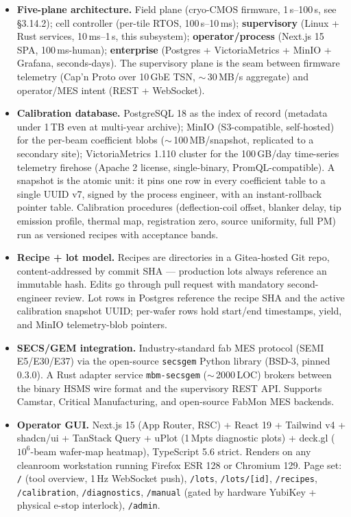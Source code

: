 \documentclass[11pt,letterpaper]{article}
\begin{document}
\begin{itemize}[leftmargin=1.6em]
  \item \textbf{Five-plane architecture.} Field plane (cryo-CMOS firmware, 1\,\textmu s--100\,\textmu s, see \S 3.14.2); cell controller (per-tile RTOS, 100\,\textmu s--10\,ms); \textbf{supervisory} (Linux + Rust services, 10\,ms--1\,s, this subsystem); \textbf{operator/process} (Next.js 15 SPA, 100\,ms-human); \textbf{enterprise} (Postgres + VictoriaMetrics + MinIO + Grafana, seconds-days). The supervisory plane is the seam between firmware telemetry (Cap'n Proto over 10\,GbE TSN, $\sim$\,30\,MB/s aggregate) and operator/MES intent (REST + WebSocket).
  \item \textbf{Calibration database.} PostgreSQL 18 as the index of record (metadata under 1\,TB even at multi-year archive); MinIO (S3-compatible, self-hosted) for the per-beam coefficient blobs ($\sim$\,100\,MB/snapshot, replicated to a secondary site); VictoriaMetrics 1.110 cluster for the 100\,GB/day time-series telemetry firehose (Apache 2 license, single-binary, PromQL-compatible). A snapshot is the atomic unit: it pins one row in every coefficient table to a single UUID v7, signed by the process engineer, with an instant-rollback pointer table. Calibration procedures (deflection-coil offset, blanker delay, tip emission profile, thermal map, registration zero, source uniformity, full PM) run as versioned recipes with acceptance bands.
  \item \textbf{Recipe + lot model.} Recipes are directories in a Gitea-hosted Git repo, content-addressed by commit SHA --- production lots always reference an immutable hash. Edits go through pull request with mandatory second-engineer review. Lot rows in Postgres reference the recipe SHA and the active calibration snapshot UUID; per-wafer rows hold start/end timestamps, yield, and MinIO telemetry-blob pointers.
  \item \textbf{SECS/GEM integration.} Industry-standard fab MES protocol (SEMI E5/E30/E37) via the open-source \texttt{secsgem} Python library (BSD-3, pinned 0.3.0). A Rust adapter service \texttt{mbm-secsgem} ($\sim$\,2000\,LOC) brokers between the binary HSMS wire format and the supervisory REST API. Supports Camstar, Critical Manufacturing, and open-source FabMon MES backends.
  \item \textbf{Operator GUI.} Next.js 15 (App Router, RSC) + React 19 + Tailwind v4 + shadcn/ui + TanStack Query + uPlot (1\,Mpts diagnostic plots) + deck.gl ($10^6$-beam wafer-map heatmap), TypeScript 5.6 strict. Renders on any cleanroom workstation running Firefox ESR 128 or Chromium 129. Page set: \texttt{/} (tool overview, 1\,Hz WebSocket push), \texttt{/lots}, \texttt{/lots/[id]}, \texttt{/recipes}, \texttt{/calibration}, \texttt{/diagnostics}, \texttt{/manual} (gated by hardware YubiKey + physical e-stop interlock), \texttt{/admin}.

\end{itemize}
\end{document}
